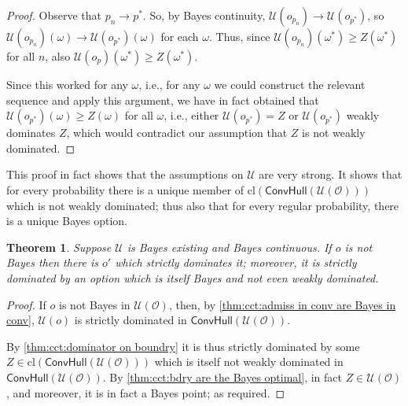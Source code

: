 \documentclass[a4paper]{article}
\newtheorem{theorem}{Theorem}
\newcommand\cl{\mathrm{cl}}
\renewcommand\O{\mathcal{O}}
\newcommand\Uwald{\mathcal{U}} %
\newcommand{\Conv}{\mathsf{ConvHull}}
\renewcommand{\geq}{\geqslant}
\newenvironment{CCM rewritten}
{\begingroup\color{blue}} %
{\endgroup}              %
\begin{document}
\begin{proof}
		Observe that $p_n\longrightarrow p^*$. So, by Bayes continuity, $\Uwald(o_{p_n})\longrightarrow \Uwald(o_{p^*})$, so $\Uwald(o_{p_n})({\omega})\longrightarrow \Uwald(o_{p^*})({\omega})$ for each ${\omega}$. Thus, since $\Uwald(o_{p_n})({\omega^*})\geq Z({\omega^*})$ for all $n$, also $\Uwald(o_p)(\omega^*)\geq Z(\omega^*)$. 
		
		Since this worked for any $\omega$, i.e., for any $\omega$ we could construct the relevant sequence and apply this argument, we have in fact obtained that $\Uwald(o_{p^*})(\omega)\geq Z(\omega)$ for all $\omega$, i.e., either $\Uwald(o_{p^*})=Z$ or $\Uwald(o_{p^*})$ weakly dominates $Z$, which would contradict our assumption that $Z$ is not weakly dominated. 
	\end{proof}
	This proof in fact shows that the assumptions on $\Uwald$ are very strong. It shows that for every probability there is a unique member of $\cl(\Conv(\Uwald(\O)))$ which is not weakly dominated; thus also that for every regular probability, there is a unique Bayes option. 
	
%		
	\begin{theorem}\label{thm:cct}
		Suppose $\Uwald$ is Bayes existing and Bayes continuous. If $o$ is not Bayes then there is $o'$ which strictly dominates it; moreover, it is strictly dominated by an option which is itself Bayes and not even weakly dominated. 
	\end{theorem}
\begin{proof}
			If $o$ is not Bayes in $\Uwald(\O)$, then, by \cref{thm:cct:admiss in conv are Bayes in conv}, $\Uwald(o)$ is strictly dominated in $\Conv(\Uwald(\O))$. 
	
	By \cref{thm:cct:dominator on boundry} it is thus strictly dominated by some $Z\in\cl(\Conv(\Uwald(\O)))$ which is itself not weakly dominated in $\Conv(\Uwald(\O))$. By \cref{thm:cct:bdry are the Bayes optimal}, in fact $Z\in \Uwald(\O)$, and moreover, it is in fact a Bayes point; as required.
\end{proof}
\end{document}
